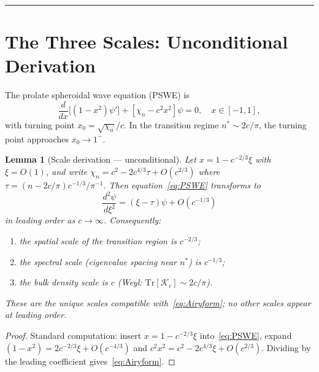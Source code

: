 \documentclass[12pt,a4paper]{amsart}
\newtheorem{lemma}[theorem]{Lemma}
\theoremstyle{definition}
\theoremstyle{remark}
\newcommand{\Kc}{\mathcal{K}_c}
\newcommand{\Tr}{\mathrm{Tr}}
\begin{document}
\maketitle
\tableofcontents
\bigskip\hrule\bigskip

\section{The Three Scales: Unconditional Derivation}
\label{sec:scales}

The prolate spheroidal wave equation (PSWE) is
\begin{equation}\label{eq:PSWE}
 \frac{d}{dx}\bigl[(1-x^2)\psi'\bigr] + [\chi_n - c^2 x^2]\psi = 0,
 \quad x\in[-1,1],
\end{equation}
with turning point $x_0 = \sqrt{\chi_n}/c$.
In the transition regime $n^* \sim 2c/\pi$,
the turning point approaches $x_0 \to 1^-$.

\begin{lemma}[Scale derivation --- unconditional]
\label{lem:scales}
Let $x = 1 - c^{-2/3}\xi$ with $\xi = O(1)$, and write
$\chi_n = c^2 - 2c^{4/3}\tau + O(c^{2/3})$ where
$\tau = (n - 2c/\pi)c^{-1/3}/\pi^{-1}$.
Then equation~\eqref{eq:PSWE} transforms to
\begin{equation}\label{eq:Airyform}
 \frac{d^2\psi}{d\xi^2} = (\xi - \tau)\psi + O(c^{-1/3})
\end{equation}
in leading order as $c\to\infty$.
Consequently:
\begin{enumerate}[nosep,label=(\roman*)]
 \item the spatial scale of the transition region is $c^{-2/3}$;
 \item the spectral scale (eigenvalue spacing near $n^*$) is $c^{-1/3}$;
 \item the bulk density scale is $c$ (Weyl: $\Tr[\Kc] \sim 2c/\pi$).
\end{enumerate}
These are the unique scales compatible with~\eqref{eq:Airyform};
no other scales appear at leading order.
\end{lemma}

\begin{proof}
Standard computation: insert $x = 1-c^{-2/3}\xi$ into~\eqref{eq:PSWE},
expand $(1-x^2) = 2c^{-2/3}\xi + O(c^{-4/3})$
and $c^2 x^2 = c^2 - 2c^{4/3}\xi + O(c^{2/3})$.
Dividing by the leading coefficient gives~\eqref{eq:Airyform}.
\end{proof}
\end{document}
